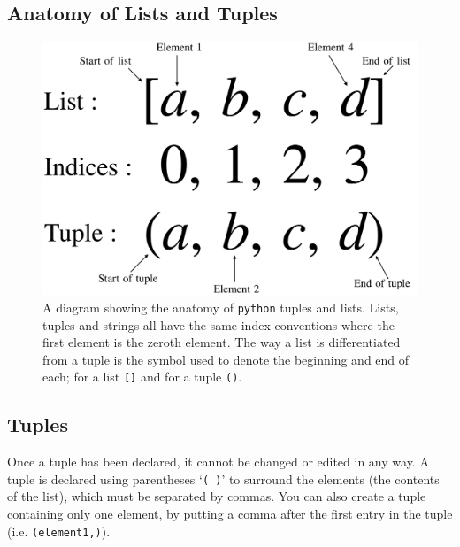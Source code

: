 \subsection*{Anatomy of Lists and Tuples}
\begin{figure}[H]  
\centering
\includegraphics[width=0.6\linewidth]{Figures/ListTup.png}
\caption{A diagram showing the anatomy of \texttt{python} tuples and lists. Lists, tuples and strings all have the same index conventions where the first element is the zeroth element. The way a list is differentiated from a tuple is the symbol used to denote the beginning and end of each; for a list \texttt{[]} and for a tuple \texttt{()}.} 
\label{fig:listtup}
\end{figure}

\subsection{Tuples}
\label{sec:Tuples}
\noindent Once a tuple has been declared, it cannot be changed or edited in any way. A tuple is declared using parentheses `\texttt{( )}' to surround the elements (the contents of the list), which must be separated by commas. You can also create a tuple containing only one element, by putting a comma after the first entry in the tuple (i.e. \texttt{(element1,)}). 


